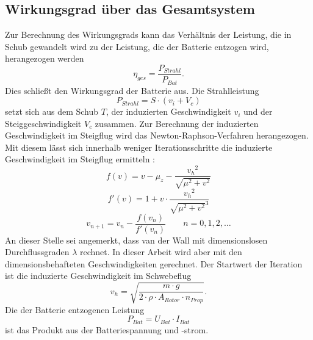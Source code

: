 \subsection{Wirkungsgrad über das Gesamtsystem}
\label{subsec:eta_ges}
Zur Berechnung des Wirkungsgrads kann das Verhältnis der Leistung, die in Schub gewandelt wird zu der Leistung, die der Batterie entzogen wird, herangezogen werden
\begin{equation}
	\eta_{ges} = \frac{P_{Strahl}}{P_{Bat}}.
\end{equation}
Dies schließt den Wirkungsgrad der Batterie aus.
Die Strahlleistung 
\begin{equation}
	P_{Strahl} = S\cdot (v_i + V_c)
\end{equation}
setzt sich aus dem Schub \ensuremath{T}, der induzierten Geschwindigkeit \ensuremath{v_i} und der Steiggeschwindigkeit \ensuremath{V_c} zusammen.
Zur Berechnung der induzierten Geschwindigkeit im Steigflug wird das Newton-Raphson-Verfahren herangezogen. Mit diesem lässt sich innerhalb weniger Iterationsschritte die induzierte Geschwindigkeit im Steigflug ermitteln \cite[S.153]{Wall.2015}:
\begin{equation}
	f(v) = v-\mu_z-\frac{{v_h}^2}{\sqrt{\mu^2+v^2}}
\end{equation}
\begin{equation}
	f'(v) = 1 + v\cdot\frac{{v_h}^2}{\sqrt{\mu^2+v^2}^3}
\end{equation}
\begin{equation}
	v_{n+1} = v_n - \frac{f(v_n)}{f'(v_n)}\qquad n = 0,1,2,\dots
\end{equation}
An dieser Stelle sei angemerkt, dass van der Wall mit dimensionslosen Durchflussgraden \ensuremath{\lambda} rechnet. In dieser Arbeit wird aber mit den dimensionsbehafteten Geschwindigkeiten gerechnet.
Der Startwert der Iteration ist die induzierte Geschwindigkeit im Schwebeflug
\begin{equation}
	v_h = \sqrt{\frac{m\cdot g}{2\cdot\rho\cdot A_{Rotor}\cdot n_{Prop}}}.
\end{equation}
Die der Batterie entzogenen Leistung
\begin{equation}
	P_{Bat} = U_{Bat}\cdot I_{Bat}
\end{equation}
ist das Produkt aus der Batteriespannung und -strom.


